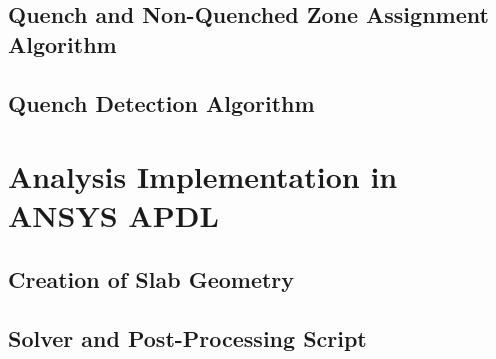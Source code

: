 \documentclass[11pt,a4paper]{report}
\begin{document}
\begin{appendices}
\section{Quench and Non-Quenched Zone Assignment Algorithm}
\label{appendix:python_nodes_search_algorithm}
% 

\section{Quench Detection Algorithm}
\label{appendix:python_quench_detection_algorithm}
% 

\clearpage
\chapter{Analysis Implementation in ANSYS APDL}
\section{Creation of Slab Geometry}
\label{appendix:apdl_slab_geometry}
% 

\section{Solver and Post-Processing Script}
\label{appendix:apdl_solver}
% 

\end{appendices}

\clearpage


\end{document}
